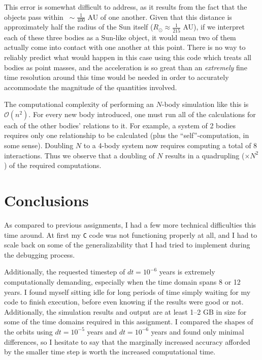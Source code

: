 \documentclass{article}
\begin{document}
This error is somewhat difficult to address, as it results from the fact that the objects pass within $\ \sim\frac{1}{400}$ AU of one another. Given that this distance is approximately half the radius of the Sun itself ($R_\odot\approx\frac{1}{215}$ AU), if we interpret each of these three bodies as a Sun-like object, it would mean two of them actually come into contact with one another at this point. There is no way to reliably predict what would happen in this case using this code which treats all bodies as point masses, and the acceleration is so great than an \emph{extremely} fine time resolution around this time would be needed in order to accurately accommodate the magnitude of the quantities involved.

\bigskip
{}
\medskip

The computational complexity of performing an $N$-body simulation like this is $\mathcal{O}(n^2)$. For every new body introduced, one must run all of the calculations for each of the other bodies' relations to it. For example, a system of 2 bodies requires only one relationship to be calculated (plus the ``self''-computation, in some sense). Doubling $N$ to a 4-body system now requires computing a total of 8 interactions. Thus we observe that a doubling of $N$ results in a quadrupling ($\times N^2$) of the required computations.

\section{Conclusions}

As compared to previous assignments, I had a few more technical difficulties this time around. At first my \texttt{C} code was not functioning properly at all, and I had to scale back on some of the generalizability that I had tried to implement during the debugging process.

Additionally, the requested timestep of $dt=10^{-6}$ years is extremely computationally demanding, especially when the time domain spans 8 or 12 years. I found myself sitting idle for long periods of time simply waiting for my code to finish execution, before even knowing if the results were good or not. Additionally, the simulation results and output are at least 1--2 GB in size for some of the time domains required in this assignment. I compared the shapes of the orbits using $dt=10^{-5}$ years and $dt=10^{-6}$ years and found only minimal differences, so I hesitate to say that the marginally increased accuracy afforded by the smaller time step is worth the increased computational time.
\end{document}
